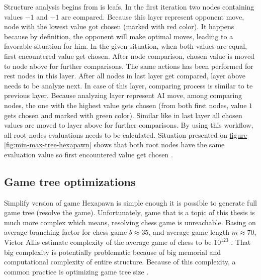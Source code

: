     Structure analysis begins from is leafs. In the first iteration two nodes containing values $-1$ and $-1$ are compared. Because this layer represent opponent move, node with the lowest value got chosen (marked with red color). It happens because by definition, the opponent will make optimal moves, leading to a favorable situation for him. In the given situation, when both values are equal, first encountered value get chosen. After node comparison, chosen value is moved to node above for further comparisons. The same actions has been performed for rest nodes in this layer. After all nodes in last layer get compared, layer above needs to be analyze next. In case of this layer, comparing process is similar to te previous layer. Because analyzing layer represent AI move, among comparing nodes, the one with the highest value gets chosen (from both first nodes, value $1$ gets chosen and marked with green color). Similar like in last layer all chosen values are moved to layer above for further comparisons. By using this workflow, all root nodes evaluations needs to be calculated. Situation presented on \hyperref[fig:min-max-tree-hexapawn]{figure \ref*{fig:min-max-tree-hexapawn}} shows that both root nodes have the same evaluation value so first encountered value get chosen \cite{bib:article-comparizon-of-search-algorithms}.

    \subsection{Game tree optimizations}\label{sec:game-tree-optimizations}
    Simplify version of game Hexapawn is simple enough it is possible to generate full game tree (resolve the game). Unfortunately, game that is a topic of this thesis is much more complex which means, resolving chess game is unreachable. Basing on average branching factor for chess game $b \approx 35$, and average game length $m \approx 70$, Victor Allis estimate complexity of the average game of chess to be $10^{123}$ \cite{bib:book-search-for-solutions-in-games}. That big complexity is potentially problematic because of big memorial and computational complexity of entire structure. Because of this complexity, a common practice is optimizing game tree size \cite{bib:article-optimal-on-game-trees}.

